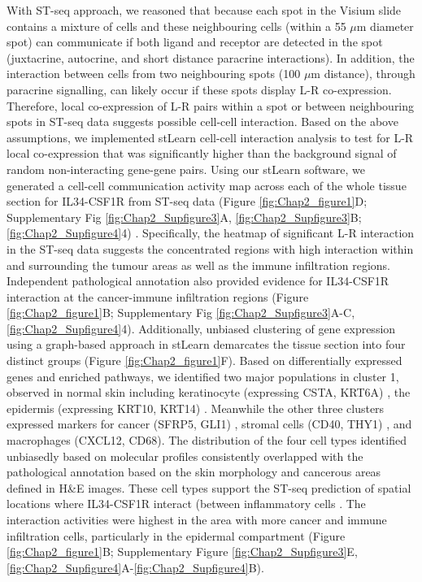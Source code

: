 With ST-seq approach, we reasoned that because each spot in the Visium slide contains a mixture of cells and these neighbouring cells (within a 55 $\mu$m diameter spot) can communicate if both ligand and receptor are detected in the spot (juxtacrine, autocrine, and short distance paracrine interactions). In addition, the interaction between cells from two neighbouring spots (100 $\mu$m distance), through paracrine signalling, can likely occur if these spots display L-R co-expression. Therefore, local co-expression of L-R pairs within a spot or between neighbouring spots in ST-seq data suggests possible cell-cell interaction. Based on the above assumptions, we implemented stLearn cell-cell interaction analysis to test for L-R local co-expression that was significantly higher than the background signal of random non-interacting gene-gene pairs. Using our stLearn software, we generated a cell-cell communication activity map across each of the whole tissue section for IL34-CSF1R from ST-seq data (Figure \ref{fig:Chap2_figure1}D; Supplementary Fig \ref{fig:Chap2_Supfigure3}A, \ref{fig:Chap2_Supfigure3}B; \ref{fig:Chap2_Supfigure4}4) \cite{pham2020stlearn}. Specifically, the heatmap of significant L-R interaction in the ST-seq data suggests the concentrated regions with high interaction within and surrounding the tumour areas as well as the immune infiltration regions. Independent pathological annotation also provided evidence for IL34-CSF1R interaction at the cancer-immune infiltration regions (Figure \ref{fig:Chap2_figure1}B; Supplementary Fig \ref{fig:Chap2_Supfigure3}A-C, \ref{fig:Chap2_Supfigure4}4). Additionally, unbiased clustering of gene expression using a graph-based approach in stLearn demarcates the tissue section into four distinct groups (Figure \ref{fig:Chap2_figure1}F). Based on differentially expressed genes and enriched pathways, we identified two major populations in cluster 1, observed in normal skin including keratinocyte (expressing CSTA, KRT6A) \cite{finnegan2019single}, the epidermis (expressing KRT10, KRT14) \cite{ji2020multimodal}. Meanwhile the other three clusters expressed markers for cancer (SFRP5, GLI1) \cite{lacour2002carcinogenesis, ji2020multimodal}, stromal cells (CD40, THY1) \cite{koumas2003thy}, and macrophages (CXCL12, CD68). The distribution of the four cell types identified unbiasedly based on molecular profiles consistently overlapped with the pathological annotation based on the skin morphology and cancerous areas defined in H\&E images. These cell types support the ST-seq prediction of spatial locations where IL34-CSF1R interact (between inflammatory cells \cite{lin2019function}. The interaction activities were highest in the area with more cancer and immune infiltration cells, particularly in the epidermal compartment (Figure \ref{fig:Chap2_figure1}B; Supplementary Figure \ref{fig:Chap2_Supfigure3}E, \ref{fig:Chap2_Supfigure4}A-\ref{fig:Chap2_Supfigure4}B).  

